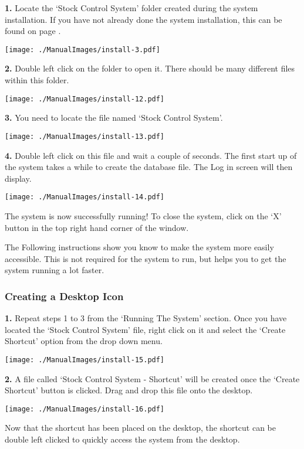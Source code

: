 \textbf{1.} Locate the `Stock Control System' folder created during the system installation. If you have not already done the system installation, this can be found on page \pageref{fig:System Installation}.

\texttt{[image: ./ManualImages/install-3.pdf]}

\textbf{2.} Double left click on the folder to open it. There should be many different files within this folder.

\texttt{[image: ./ManualImages/install-12.pdf]}

\textbf{3.} You need to locate the file named `Stock Control System'.

\texttt{[image: ./ManualImages/install-13.pdf]}

\textbf{4.} Double left click on this file and wait a couple of seconds. The first start up of the system takes a while to create the database file. The Log in screen will then display.

\texttt{[image: ./ManualImages/install-14.pdf]}

The system is now successfully running! To close the system, click on the `X' button in the top right hand corner of the window.

\pagebreak

The Following instructions show you know to make the system more easily accessible. This is not required for the system to run, but helps you to get the system running a lot faster.

\subsubsection{Creating a Desktop Icon}

\textbf{1.} Repeat steps 1 to 3 from the `Running The System' section. Once you have located the `Stock Control System' file, right click on it and select the `Create Shortcut' option from the drop down menu.

\texttt{[image: ./ManualImages/install-15.pdf]}

\textbf{2.} A file called `Stock Control System - Shortcut' will be created once the `Create Shortcut' button is clicked. Drag and drop this file onto the desktop.

\texttt{[image: ./ManualImages/install-16.pdf]}

Now that the shortcut has been placed on the desktop, the shortcut can be double left clicked to quickly access the system from the desktop.

